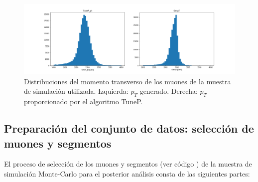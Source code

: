 \begin{figure}[h]
\centering
\includegraphics[width=1.0\textwidth]{figures/data_pt.png}
\caption{Distribuciones del momento transverso de los muones de la muestra de simulaci\'on utilizada. Izquierda: $p_{T}$ generado. Derecha: $p_{T}$ proporcionado por el algoritmo TuneP.}
\label{fig:data_pt}        
\end{figure}


\subsection{Preparaci\'on del conjunto de datos: selecci\'on de muones y segmentos}\label{sec:selection}

El proceso de selecci\'on de los muones y segmentos (ver c\'odigo \cite{analyzer}) de la muestra de simulaci\'on Monte-Carlo para el posterior an\'alisis consta de las siguientes partes: 

